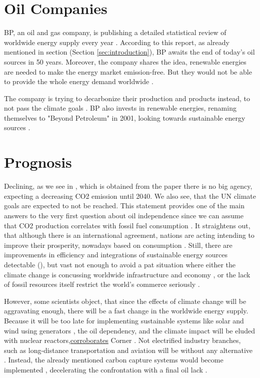 \section{Oil Companies}
\label{sec:BP}
BP, an oil and gas company, is publishing a detailed statistical review of worldwide energy supply every year \cite{BP}.
According to this report, as already mentioned in section (Section \ref{sec:introduction}), BP awaits the end of today's oil sources in 50 years.
Moreover, the company shares the idea, renewable energies are needed to make the energy market emission-free.
But they would not be able to provide the whole energy demand worldwide \cite[1]{BP}.
\par
The company is trying to decarbonize their production and products instead, to not pass the climate goals \cite{BP_renew}.
BP also invests in renewable energies, renaming themselves to "Beyond Petroleum" in 2001, looking towards sustainable energy sources \cite{BP_renew}.

\section{Prognosis}
\label{sec:prognosis}
Declining, as we see in , which is obtained from the paper \cite[633]{UN_Climate_Goals} there is no big agency, expecting a decreasing CO2 emission until 2040.
We also see, that the UN climate goals are expected to not be reached. 
This statement provides one of the main answers to the very first question about oil independence since we can assume that CO2 production correlates with fossil fuel consumption \cite{oil_comb} \cite{OILCombustion}.
It straightens out, that although there is an international agreement, nations are acting intending to improve their prosperity, nowadays based on consumption \cite{Sweden} \cite{capitalism} \cite[1577]{ChinaEvol}. 
Still, there are improvements in efficiency and integrations of sustainable energy sources detectable (), 
but vast not enough to avoid a pat situation where either the climate change is concussing 
worldwide infrastructure and economy \cite[3]{Sweden}, or the lack of fossil resources itself restrict the world's commerce seriously \cite{Bible}.
\par
{\Large However, some scientists object, that} since the effects of climate change will be aggravating enough, there will be a fast change in the worldwide energy 
supply. \cite{nuclear}
Because it will be too late for implementing sustainable systems like solar and wind using generators \cite{WEO}, the oil dependency, and the climate impact will be eluded with nuclear reactors,\underline{corroborates} Corner \cite[4828]{nuclear}.
Not electrified industry branches, such as long-distance transportation and aviation will be without any alternative \cite{WEO}.
Instead, the already mentioned carbon capture systems would become implemented \cite{UN_Plan}, decelerating the confrontation with a final oil lack \cite{nuclear}.

